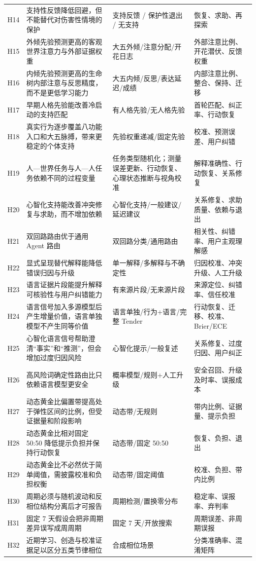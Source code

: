 \documentclass[UTF8,a4paper,11pt]{ctexart}
\begin{document}
\begin{center}
\begin{longtable}{@{}p{1.4cm}p{4.5cm}p{5.2cm}p{3.4cm}@{}}
H14 & 支持性反馈降低回避，但不能替代对伤害性情境的保护 & 支持反馈 / 保护性退出 / 无支持 & 恢复、求助、再探索 \\
H15 & 外倾先验预测更高的客观世界注意力与外部证据权重 & 大五外倾/注意分配/开花日志 & 外部注意比例、开花潜伏、反馈权重 \\
H16 & 内倾先验预测更高的生命树内部注意与反思精度，而不是更低学习能力 & 大五内倾/反思/表达延迟/成绩 & 内部注意比例、整合、保持、迁移 \\
H17 & 早期人格先验能改善冷启动的支持匹配 & 有人格先验/无人格先验 & 首轮匹配、纠正率、行动恢复 \\
H18 & 真实行为逐步覆盖八功能入口和大五脉搏，带来更稳定的个体支持 & 先验权重递减/固定先验 & 校准、预测误差、用户纠错 \\
H19 & 人—世界任务与人—人任务依赖不同的过程变量 & 任务类型随机化；测量误差更新、行动恢复、心理状态推断与视角校准 & 解释准确性、行动恢复、关系修复 \\
H20 & 心智化支持能改善冲突修复与求助，而不增加依赖 & 心智化支持/一般建议/延迟建议 & 关系修复、求助质量、依赖与退出 \\
H21 & 双回路路由优于通用 Agent 路由 & 双回路分类/通用路由 & 相关性、纠错率、用户主观理解感 \\
H22 & 显式呈现替代解释能降低错误归因与升级 & 单一解释/多解释与不确定性 & 归因校准、冲突升级、人工升级 \\
H23 & 语言证据片段能提升解释可核验性与用户纠错能力 & 有来源片段/无来源片段 & 来源定位、纠错率、信任校准 \\
H24 & 语言信号加入多源模型后产生增量价值，语言单独模型不产生同等价值 & 语言单独/行为+语言/完整 Tender & 行动恢复、迁移、校准、Brier/ECE \\
H25 & 心智化语言信号帮助澄清“事实”和“推测”，但会增加过度归因风险 & 心智化提示/一般复述 & 关系修复、过度归因、用户纠正 \\
H26 & 高风险词确定性路由比只依赖语言模型更安全 & 概率模型/规则+人工升级 & 安全召回、升级及时率、误报成本 \\
H27 & 动态黄金比偏置带提高处于弹性区间的比例，但受证据量和阶段影响 & 动态带/无规则 & 带内比例、证据量、提示负担 \\
H28 & 动态黄金比相对固定 50:50 降低提示负担并保持行动恢复 & 动态带/固定 50:50 & 恢复、负担、退出 \\
H29 & 动态黄金比不必然优于简单阈值，需披露校准和负担权衡 & 动态带/固定阈值 & 校准、负担、带内比例 \\
H30 & 周期必须与随机波动和反相位结构分离后才可报告 & 周期检测/置换零分布 & 稳定率、误报率、弃判率 \\
H31 & 固定 7 天假设会把非周期差异误写成周周期 & 固定 7 天/开放搜索 & 周期误差、非周期误报 \\
H32 & 近期学习、创造与校准证据足以区分五类节律相位 & 合成相位场景 & 分类准确率、混淆矩阵 \\
\bottomrule
\end{longtable}
\end{center}
\end{document}
